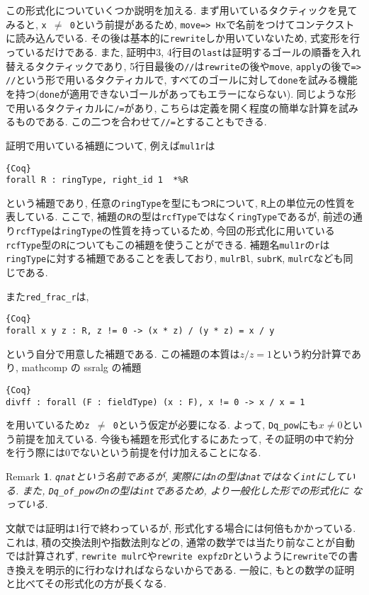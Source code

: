 \documentclass[11pt]{jsreport}
\theoremstyle{mystyle}
\newtheorem{rmk}[df]{$\textrm{Remark}$}
\newcommand{\brmk}{\begin{rmk}}
\newcommand{\ermk}{\end{rmk}}
\newcommand{\0}{\textbf{0}}
\begin{document}
この形式化についていくつか説明を加える. まず用いているタクティックを見てみると, {\tt x $\neq$ 0}という前提があるため, {\tt move=> Hx}で名前をつけてコンテクストに読み込んでいる. その後は基本的に{\tt rewrite}しか用いていないため, 式変形を行っているだけである. また, 証明中3, 4行目の{\tt last}は証明するゴールの順番を入れ替えるタクティックであり, 5行目最後の{\tt //}は{\tt rewrite}の後や{\tt move}, {\tt apply}の後で{\tt => //}という形で用いるタクティカルで, すべてのゴールに対して{\tt done}を試みる機能を持つ({\tt done}が適用できないゴールがあってもエラーにならない). 同じような形で用いるタクティカルに{\tt /=}があり, こちらは定義を開く程度の簡単な計算を試みるものである. この二つを合わせて{\tt //=}とすることもできる. 

証明で用いている補題について, 例えば{\tt mul1r}は
\begin{lstlisting}{Coq}
forall R : ringType, right_id 1  *%R
\end{lstlisting}
という補題であり, 任意の{\tt ringType}を型にもつ{\tt R}について, {\tt R}上の単位元の性質を表している. ここで, 補題の{\tt R}の型は{\tt rcfType}ではなく{\tt ringType}であるが, 前述の通り{\tt rcfType}は{\tt ringType}の性質を持っているため, 今回の形式化に用いている{\tt rcfType}型の{\tt R}についてもこの補題を使うことができる. 補題名{\tt mul1r}の{\tt r}は{\tt ringType}に対する補題であることを表しており, {\tt mulrBl}, {\tt subrK}, {\tt mulrC}なども同じである. 

また{\tt red\_frac\_r}は, 
\begin{lstlisting}{Coq}
forall x y z : R, z != 0 -> (x * z) / (y * z) = x / y \end{lstlisting}
という自分で用意した補題である. この補題の本質は$z / z = 1$という約分計算であり, mathcomp の ssralg の補題
\begin{lstlisting}{Coq}
divff : forall (F : fieldType) (x : F), x != 0 -> x / x = 1 \end{lstlisting}
を用いているため{\tt z $\neq$ 0}という仮定が必要になる. よって, {\tt Dq\_pow}にも{\tt $x \ne 0$}という前提を加えている. 今後も補題を形式化するにあたって, その証明の中で約分を行う際には$0$でないという前提を付け加えることになる. 
\brmk
  {\tt qnat}という名前であるが, 実際には{\tt n}の型は{\tt nat}ではなく{\tt int}にしている. 
  また, {\tt Dq\_of\_pow}の{\tt n}の型は{\tt int}であるため, より一般化した形での形式化に
  なっている. 
\ermk
文献\cite{Kac}では証明は1行で終わっているが, 形式化する場合には何倍もかかっている. これは, 積の交換法則や指数法則などの, 通常の数学では当たり前なことが自動では計算されず, {\tt rewrite mulrC}や{\tt rewrite expfzDr}というように{\tt rewrite}での書き換えを明示的に行わなければならないからである. 一般に, もとの数学の証明と比べてその形式化の方が長くなる. 
\end{document}
